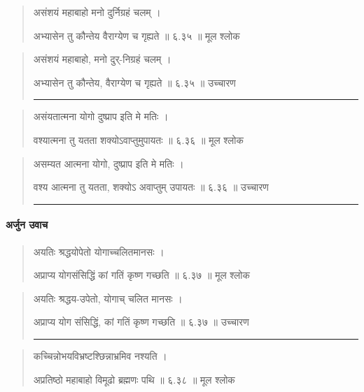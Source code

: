 \begin{quotation}  




असंशयं महाबाहो मनो दुर्निग्रहं चलम्‌  ।  

अभ्यासेन तु कौन्तेय वैराग्येण च गृह्यते  ॥ ६.३५ ॥  मूल श्लोक
\end{quotation}

\begin{quotation}

असंशयं महाबाहो, मनो दुर्-निग्रहं चलम्‌  ।  

अभ्यासेन तु कौन्तेय, वैराग्येण च गृह्यते  ॥ ६.३५ ॥  उच्चारण

\noindent\rule{16cm}{0.4pt} 
\end{quotation}


\begin{quotation}  

असंयतात्मना योगो दुष्प्राप इति मे मतिः  ।  

वश्यात्मना तु यतता शक्योऽवाप्तुमुपायतः  ॥ ६.३६ ॥  मूल श्लोक
\end{quotation}

\begin{quotation}

असम्यत आत्मना योगो, दुष्प्राप इति मे मतिः  ।  

वश्य आत्मना तु यतता, शक्योऽ अवाप्तुम् उपायतः  ॥ ६.३६ ॥  उच्चारण

\noindent\rule{16cm}{0.4pt} 
\end{quotation}


\paragraph{\sanskrit अर्जुन उवाच}
\begin{quotation}  



अयतिः श्रद्धयोपेतो योगाच्चलितमानसः  ।  

अप्राप्य योगसंसिद्धिं कां गतिं कृष्ण गच्छति  ॥ ६.३७ ॥  मूल श्लोक
\end{quotation}

\begin{quotation}

अयतिः श्रद्धय-उपेतो, योगाच् चलित मानसः  ।  

अप्राप्य योग संसिद्धिं, कां गतिं कृष्ण गच्छति  ॥ ६.३७ ॥  उच्चारण

\noindent\rule{16cm}{0.4pt} 
\end{quotation}


\begin{quotation}  

कच्चिन्नोभयविभ्रष्टश्छिन्नाभ्रमिव नश्यति  ।  

अप्रतिष्ठो महाबाहो विमूढो ब्रह्मणः पथि  ॥ ६.३८ ॥  मूल श्लोक
\end{quotation}

